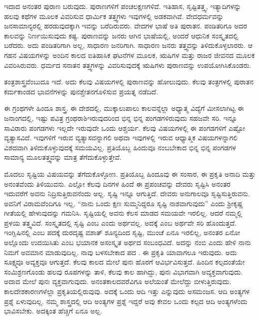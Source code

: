 ಇದಾದ ಅನಂತರ ಪುರಾಣ ಬರುವುದು. ಪುರಾಣಗಳಿಗೆ ಪಂಚಲಕ್ಷಣಗಳಿವೆ. ಇತಿಹಾಸ, ಸೃಷ್ಟಿತತ್ತ್ವ, ಇತ್ಯಾದಿಗಳನ್ನು ಹಲವು ಕಥೆಗಳ ಮೂಲಕ ವಿವರಿಸುವ ಧಾರ್ಮಿಕ ತತ್ತ್ವಗಳು ಇವುಗಳಲ್ಲಿ ಅಡಕವಾಗಿವೆ. ವೇದಧರ್ಮವನ್ನು ಜನಸಾಮಾನ್ಯರಲ್ಲಿ ಹರಡುವುದಕ್ಕಾಗಿ ಇವನ್ನು ಬರೆದಿರುವರು. ವೇದಗಳ ಭಾಷೆ ಅತಿ ಪುರಾತನ. ಪಂಡಿತರಿಗೂ ಅದರ ಕಾಲವನ್ನು ನಿರ್ಣಯಿಸುವುದು ಕಷ್ಟ. ಪುರಾಣವನ್ನು ಜನರು ಆಗಿನ ಭಾಷೆಯಲ್ಲಿ, ಅಂದರೆ ಆಧುನಿಕ ಸಂಸ್ಕೃತದಲ್ಲಿ ಬರೆದರು. ಅದು ಪಂಡಿತರಿಗಾಗಿ ಅಲ್ಲ, ಸಾಧಾರಣ ಜನರಿಗಾಗಿ. ಸಾಧಾರಣ ಜನರು ತತ್ತ್ವವನ್ನು ತಿಳಿದುಕೊಳ್ಳಲಾರರು. ಆ ಗಹನ ವಿಷಯಗಳನ್ನು ಅಂದಿನ ಕಾಲದ ಐತಿಹಾಸಿಕ ಘಟನೆಗಳ ಮೂಲಕ, ಋಷಿಗಳ ಮತ್ತು ರಾಜರ ಜೀವನದ ಮೂಲಕ ವಿವರಿಸಿರುವರು. ಧರ್ಮದ ಸನಾತನ ತತ್ತ್ವಗಳನ್ನು ವಿವರಿಸುವುದಕ್ಕೆ ಋಷಿಗಳು ಪುರಾಣವನ್ನು ಉಪಯೋಗಿಸಿಕೊಂಡರು.

ತಂತ್ರಶಾಸ್ತ್ರವೆಂಬುದೂ ಇದೆ. ಅದು ಕೆಲವು ವಿಷಯಗಳಲ್ಲಿ ಪುರಾಣವನ್ನು ಹೋಲುವುದು. ಕೆಲವು ತಂತ್ರಗಳಲ್ಲಿ ಪುರಾತನ ಕರ್ಮಕಾಂಡದ ಭಾವನೆಗಳನ್ನು ಪುನಶ್ಚೇತನಗೊಳಿಸುವ ಪ್ರಯತ್ನ ನಡೆದಿದೆ.

ಈ ಗ್ರಂಥಗಳೇ ಹಿಂದೂ ಶಾಸ್ತ್ರ. ಈ ದೇಶದಲ್ಲಿ, ಮುಕ್ಕಾಲುಪಾಲು ಕಾಲ\break ವನ್ನೆಲ್ಲಾ ಅಧ್ಯಾತ್ಮ ವಿದ್ಯೆಗೆ ಮೀಸಲಾಗಿಟ್ಟ ಈ ಜನಾಂಗದಲ್ಲಿ, ಇಷ್ಟು ಪವಿತ್ರ ಗ್ರಂಥರಾಶಿ\break ಇರುವುದರಿಂದ ಭಿನ್ನ ಭಿನ್ನ ಪಂಗಡಗಳಿರುವುದು ಸಹಜವೇ ಸರಿ. ಇನ್ನೂ ಸಾವಿರಾರು ಪಂಗಡಗಳು ಇಲ್ಲದೇ ಇರುವುದೇ ಒಂದು ಆಶ್ಚರ್ಯ. ಕೆಲವು ವಿಷಯಗಳಲ್ಲಿ ಈ ಪಂಗಡಗಳಿಗೆ ಎಷ್ಟೋ ವ್ಯತ್ಯಾಸವಿದೆ. ಇವುಗಳಿಗೆ ಇರುವ ವ್ಯತ್ಯಾಸವನ್ನಾಗಲಿ ಅಥವಾ ಇವುಗಳಲ್ಲಿ ಇರುವ ಆಧ್ಯಾತ್ಮಿಕ ವಿಷಯಗಳನ್ನಾಗಲಿ ವಿಶದವಾಗಿ ತಿಳಿದುಕೊಳ್ಳುವುದಕ್ಕೆ ಸಮಯವಿಲ್ಲ. ಪ್ರತಿಯೊಬ್ಬ ಹಿಂದುವೂ ನಂಬಬೇಕಾದ ಭಿನ್ನ ಭಿನ್ನ ಪಂಗಡಗಳ ಸಾಮಾನ್ಯ ಮೂಲತತ್ತ್ವವನ್ನು ಮಾತ್ರ ತೆಗೆದುಕೊಳ್ಳುತ್ತೇವೆ.

ಮೊದಲು ಸೃಷ್ಟಿಯ ವಿಷಯವನ್ನು ತೆಗೆದುಕೊಳ್ಳೋಣ. ಪ್ರತಿಯೊಬ್ಬ ಹಿಂದೂವು ಈ ಸಂಸಾರ, ಈ ಪ್ರಕೃತಿ ಅನಾದಿ ಮತ್ತು ಅನಂತವೆಂದು ತಿಳಿಯುವನು. ಎಲ್ಲೋ ಕೆಲವು ದಿನಗಳ ಹಿಂದೆ ಈ ಪ್ರಪಂಚವನ್ನು ದೇವರು ಸೃಷ್ಟಿಸಿ ಅನಂತರ ಇದುವರೆಗೆ ಅವನು ನಿದ್ರಿಸುತ್ತಿರುವನೆಂದು ಅಲ್ಲ. ಸೃಷ್ಟಿ ಇನ್ನೂ ಆಗುತ್ತಿದೆ. ದೇವರು ಅನುಗಾಲವೂ ಸೃಷ್ಟಿಸು\-ತ್ತಿರುವನು. ಅವನಿಗೆ ವಿರಾಮವೆಂದಿಗೂ ಇಲ್ಲ. “ನಾನು ಒಂದು ಕ್ಷಣ ಸುಮ್ಮನಿದ್ದರೂ ಸೃಷ್ಟಿ ನಾಶವಾಗುವುದು” ಎಂದು ಶ‍್ರೀಕೃಷ್ಣ ಗೀತೆಯಲ್ಲಿ ಹೇಳುವುದನ್ನು ಗಮನಿಸಿ. ಸೃಷ್ಟಿಯಲ್ಲಿ ಅವನು ಕೆಲಸ ಮಾಡದ ಸಮಯವೇ ಇರಲಿಲ್ಲ. ಆದರೆ ನಮ್ಮಲ್ಲಿ ಪ್ರಳಯ ತತ್ತ್ವವಿದೆ. ಸಂಸ್ಕೃತದಲ್ಲಿ ಸೃಷ್ಟಿ ಎಂಬ  ಎಂದು ಅರ್ಥವಲ್ಲ. ಅದಕ್ಕೆ  ಎಂಬ ಅರ್ಥವೇ ಸರಿ ಹೊಂದುತ್ತದೆ. ಇಂಗ್ಲಿಷಿನಲ್ಲಿ  ಎಂಬ ಪದಕ್ಕೆ ದುರದೃಷ್ಟ ವಶಾತ್​ ಶೂನ್ಯದಿಂದ ಸೃಷ್ಟಿ, ಮುಂಚೆ ಏನೂ ಇರಲಿಲ್ಲ, ಅನಂತರ ಏನೋ ಅಲ್ಲೊಂದು ಉದಯಿಸಿತು ಎಂಬ ಭಯಾನಕ ಅಸಂಸ್ಕೃತ ಅರ್ಥದ ಸಂಬಂಧವಿದೆ. ಅದನ್ನು ನಂಬಿ ಎಂದು ಹೇಳಿ ನಾನು ನಿಮಗೆ ಅವಮಾನ ಮಾಡುವುದಿಲ್ಲ. ನಾವು ಬಳಸಬೇಕಾದ ಪದ . ಈ ಪ್ರಕೃತಿ ಯಾವಾಗಲೂ ಇರುವುದು. ಅದು ಸೂಕ್ಷ್ಮವೂ ಅವ್ಯಕ್ತವೂ ಆಗುತ್ತದೆ. ಕೆಲವು ಕಾಲದ ಮೇಲೆ ಪುನಃ ಹೊರಗೆ ಆವಿರ್ಭವಿಸುತ್ತದೆ. ಹಿಂದಿನ ಕಲ್ಪದಂತೆಯೇ ಸಂಮಿಶ್ರಣಗೊಂಡು ಹಲವು ರೂಪಗಳನ್ನು ತಾಳಿ, ಕೆಲವು ಕಾಲ ಹಾಗಿದ್ದು, ಪುನಃ ವಿಭಾಗವಾಗಿ ಅವ್ಯಕ್ತವಾಗುವುದು. ಅದಾದ ಮೇಲೆ ಪುನಃ ವ್ಯಕ್ತವಾಗುವುದು. ಅನಂತಕಾಲದವರೆವಿಗೂ ಅಲೆಯಂತೆ ಮೇಲೆದ್ದು ಬೀಳುತ್ತಿರುವುದು. ಕಾಲದೇಶಕಾರಣಗಳೆಲ್ಲಾ ಪ್ರಕೃತಿಯಲ್ಲಿರುವುವು. ಅದಕ್ಕೆ ಒಂದು ಆದಿ ಇತ್ತು ಎನ್ನುವುದು ಅಸಮಂಜಸ. ಆದಿ ಅಂತ್ಯಗಳ ಪ್ರಶ್ನೆ ಏಳುವುದಿಲ್ಲ. ನಮ್ಮ ಶಾಸ್ತ್ರದಲ್ಲಿ ಆದಿ ಅಂತ್ಯಗಳ ಪ್ರಶ್ನೆ ಇದ್ದರೆ ಅವು ಕೇವಲ ಒಂದು ಕಲ್ಪದ ಆದಿ ಅಂತ್ಯಗಳೆಂದು ಭಾವಿಸಬೇಕು. ಅದಕ್ಕಿಂತ ಹೆಚ್ಚಿಗೆ ಏನೂ ಅಲ್ಲ.

